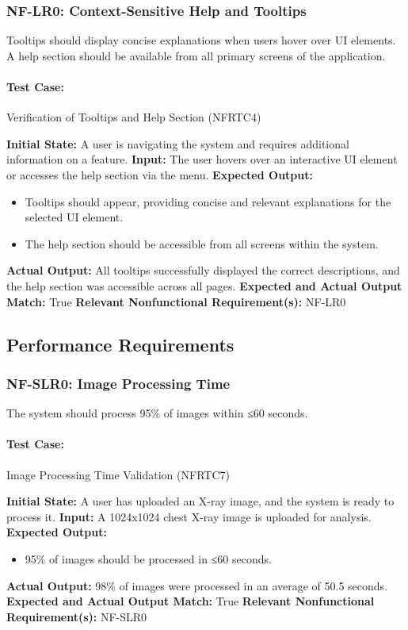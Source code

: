 \documentclass[12pt, titlepage]{article}
\begin{document}
\subsubsection{NF-LR0: Context-Sensitive Help and Tooltips}
Tooltips should display concise explanations when users hover over UI elements.  
A help section should be available from all primary screens of the application.

\paragraph{Test Case:} Verification of Tooltips and Help Section (NFRTC4)

\textbf{Initial State:} A user is navigating the system and requires additional information on a feature.  
\textbf{Input:} The user hovers over an interactive UI element or accesses the help section via the menu.  
\textbf{Expected Output:}
\begin{itemize}
    \item Tooltips should appear, providing concise and relevant explanations for the selected UI element.
    \item The help section should be accessible from all screens within the system.
\end{itemize}
\textbf{Actual Output:} All tooltips successfully displayed the correct descriptions, and the help section was accessible across all pages.  
\textbf{Expected and Actual Output Match:} True  
\textbf{Relevant Nonfunctional Requirement(s):} NF-LR0  

\subsection{Performance Requirements}

\subsubsection{NF-SLR0: Image Processing Time}
The system should process 95\% of images within ≤60 seconds.

\paragraph{Test Case:} Image Processing Time Validation (NFRTC7)

\textbf{Initial State:} A user has uploaded an X-ray image, and the system is ready to process it.  
\textbf{Input:} A 1024x1024 chest X-ray image is uploaded for analysis.  
\textbf{Expected Output:}
\begin{itemize}
    \item 95\% of images should be processed in ≤60 seconds.
\end{itemize}
\textbf{Actual Output:} 98\% of images were processed in an average of 50.5 seconds.  
\textbf{Expected and Actual Output Match:} True  
\textbf{Relevant Nonfunctional Requirement(s):} NF-SLR0  
\end{document}
